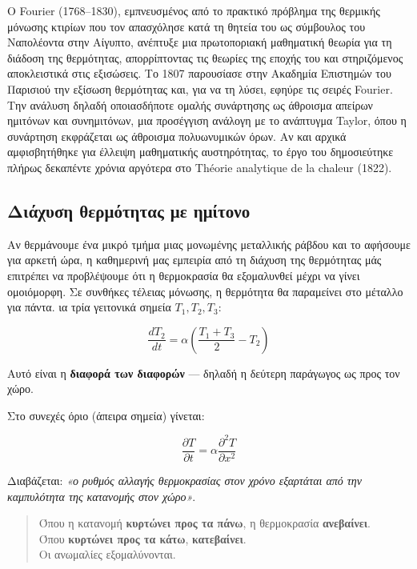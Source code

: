 \documentclass[a4paper, 11pt]{article}
\begin{document}
Ο Fourier (1768--1830), εμπνευσμένος από το πρακτικό πρόβλημα της
θερμικής μόνωσης κτιρίων που τον απασχόλησε κατά τη θητεία του ως
σύμβουλος του Ναπολέοντα στην Αίγυπτο, ανέπτυξε μια πρωτοποριακή
μαθηματική θεωρία για τη διάδοση της θερμότητας, απορρίπτοντας τις
θεωρίες της εποχής του και στηριζόμενος αποκλειστικά στις εξισώσεις. Το
1807 παρουσίασε στην Ακαδημία Επιστημών του Παρισιού την εξίσωση
θερμότητας και, για να τη λύσει, εφηύρε τις σειρές Fourier. Την ανάλυση
δηλαδή οποιασδήποτε ομαλής συνάρτησης ως άθροισμα απείρων ημιτόνων και
συνημιτόνων, μια προσέγγιση ανάλογη με το ανάπτυγμα Taylor, όπου η
συνάρτηση εκφράζεται ως άθροισμα πολυωνυμικών όρων. Αν και αρχικά
αμφισβητήθηκε για έλλειψη μαθηματικής αυστηρότητας, το έργο του
δημοσιεύτηκε πλήρως δεκαπέντε χρόνια αργότερα στο Théorie analytique de
la chaleur (1822).

\subsection{Διάχυση θερμότητας με
ημίτονο}\label{ux3b4ux3b9ux3acux3c7ux3c5ux3c3ux3b7-ux3b8ux3b5ux3c1ux3bcux3ccux3c4ux3b7ux3c4ux3b1ux3c2-ux3bcux3b5-ux3b7ux3bcux3afux3c4ux3bfux3bdux3bf}

Αν θερμάνουμε ένα μικρό τμήμα μιας μονωμένης μεταλλικής ράβδου και το
αφήσουμε για αρκετή ώρα, η καθημερινή μας εμπειρία από τη διάχυση της
θερμότητας μάς επιτρέπει να προβλέψουμε ότι η θερμοκρασία θα εξομαλυνθεί
μέχρι να γίνει ομοιόμορφη. Σε συνθήκες τέλειας μόνωσης, η θερμότητα θα
παραμείνει στο μέταλλο για πάντα. ια τρία γειτονικά σημεία
\(T_1, T_2, T_3\):

\[\frac{dT_2}{dt} = \alpha \left(\frac{T_1 + T_3}{2} - T_2\right)\]

Αυτό είναι η \textbf{διαφορά των διαφορών} --- δηλαδή η δεύτερη
παράγωγος ως προς τον χώρο.

Στο συνεχές όριο (άπειρα σημεία) γίνεται:

\[\frac{\partial T}{\partial t} = \alpha \frac{\partial^2 T}{\partial x^2}\]

Διαβάζεται: \emph{«ο ρυθμός αλλαγής θερμοκρασίας στον χρόνο εξαρτάται
από την καμπυλότητα της κατανομής στον χώρο»}.

\begin{quote}
Όπου η κατανομή \textbf{κυρτώνει προς τα πάνω}, η θερμοκρασία
\textbf{ανεβαίνει}.\\
Όπου \textbf{κυρτώνει προς τα κάτω}, \textbf{κατεβαίνει}.\\
Οι ανωμαλίες εξομαλύνονται.
\end{quote}
\end{document}
